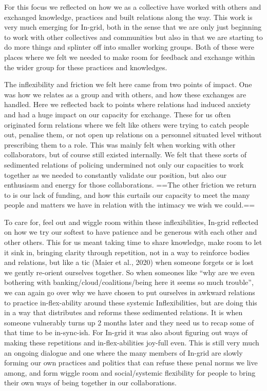 For this focus we reflected on how we as a collective have worked with
others and exchanged knowledge, practices and built relations along the
way. This work is very much emerging for In-grid, both in the sense that
we are only just beginning to work with other collectives and
communities but also in that we are starting to do more things and
splinter off into smaller working groups. Both of these were places
where we felt we needed to make room for feedback and exchange within
the wider group for these practices and knowledges.

The inflexibility and friction we felt here came from two points of
impact. One was how we relates as a group and with others, and how these
exchanges are handled. Here we reflected back to points where relations
had induced anxiety and had a huge impact on our capacity for exchange.
These for us often originated form relations where we felt like others
were trying to catch people out, penalise them, or not open up relations
on a personnel situated level without prescribing them to a role. This
was mainly felt when working with other collaborators, but of course
still existed internally. We felt that these sorts of sedimented
relations of policing undermined not only our capacities to work
together as we needed to constantly validate our position, but also our
enthusiasm and energy for those collaborations. ==The other friction we
return to is our lack of funding, and how this curtails our capacity to
meet the many people and matters we have in relation with the intimacy
we wish we could.==

To care for, feel out and wiggle room within these inflexibilities,
In-grid reflected on how we try our softest to have patience and be
generous with each other and other others. This for us meant taking time
to share knowledge, make room to let it sink in, bringing clarity
through repetition, not in a way to reinforce bodies and relations, but
like a tic (Maier et al., 2020) when someone forgets or is lost we
gently re-orient ourselves together. So when someones like ``why are we
even bothering with banking/cloud/coalitions/being here it seems so much
trouble'', we can again go over why we have chosen to put ourselves in
awkward relations to practice in-flex-ability around these systemic
Inflexibilities, but are doing this in a way that distributes and
reforms these sedimented relations. It is when someone vulnerably turns
up 2 months later and they need us to recap some of that time to be
in-sync-ish. For In-grid it was also about figuring out ways of making
these repetitions and in-flex-abilities joy-full even. This is still
very much an ongoing dialogue and one where the many members of In-grid
are slowly forming our own practices and politics that can refuse these
penal norms we live among, and form wiggle room and social/systemic
flexibility for people to bring their own ways of being together in our
collaborations.

